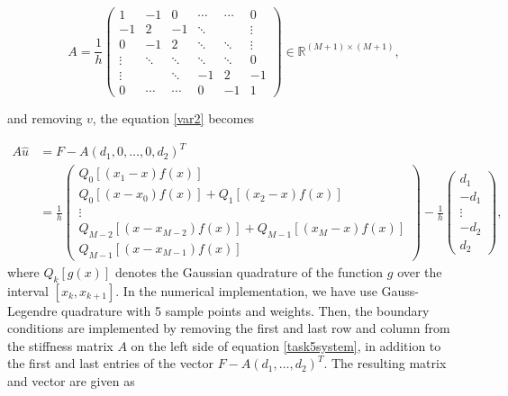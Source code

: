 \begin{equation*}
    A =  \frac{1}{h}\begin{pmatrix}
        1 & -1 & 0 & \cdots & \cdots & 0 \\
        -1 & 2 & -1 & \ddots &   & \vdots \\
        0 & -1 & 2 & \ddots & \ddots & \vdots \\
        \vdots & \ddots & \ddots & \ddots & \ddots & 0 \\
        \vdots &  & \ddots & -1 & 2 & -1 \\
        0 & \cdots & \cdots & 0 & -1 & 1
    \end{pmatrix} \in \mathbb{R}^{(M+1) \times (M+1)},
\end{equation*}

\noindent and removing $v$, the equation \eqref{var2} becomes

\begin{equation}
\begin{split}
    A\hat{u} &= F-A(d_1, 0, \dots, 0, d_2)^T \\
             &= 
            \frac{1}{h}\begin{pmatrix}
                Q_0[(x_1 - x) f(x)] \\
                Q_0[(x - x_0) f(x)] + Q_1[(x_2 - x) f(x)] \\
                \vdots \\
                Q_{M-2}[(x - x_{M-2}) f(x)] + Q_{M-1}[(x_M - x) f(x)] \\
                Q_{M-1}[(x - x_{M-1}) f(x)]
            \end{pmatrix}
            -
            \frac{1}{h} \begin{pmatrix}
                d_1 \\
                -d_1 \\
                \vdots \\
                -d_2 \\
                d_2
            \end{pmatrix},
\label{task5system}
\end{split}
\end{equation}
where $Q_k[g(x)]$ denotes the Gaussian quadrature of the function $g$ over the interval $[x_k, x_{k + 1}]$. In the numerical implementation, we have use Gauss-Legendre quadrature with 5 sample points and weights. Then, the boundary conditions are implemented by removing the first and last row and column from the stiffness matrix $A$ on the left side of equation \eqref{task5system}, in addition to the first and last entries of the vector $F - A(d_1, \ldots, d_2)^T$. The resulting matrix and vector are given as

